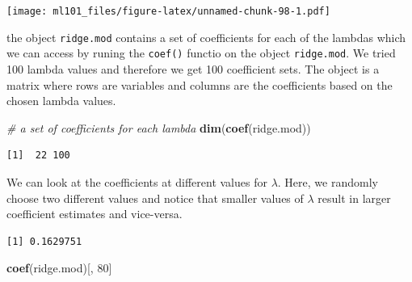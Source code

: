 \documentclass[]{article}
\newenvironment{Shaded}{\begin{snugshade}}{\end{snugshade}}
\newcommand{\CommentTok}[1]{\textcolor[rgb]{0.56,0.35,0.01}{\textit{#1}}}
\newcommand{\DecValTok}[1]{\textcolor[rgb]{0.00,0.00,0.81}{#1}}
\newcommand{\KeywordTok}[1]{\textcolor[rgb]{0.13,0.29,0.53}{\textbf{#1}}}
\newcommand{\NormalTok}[1]{#1}
\newcommand{\OperatorTok}[1]{\textcolor[rgb]{0.81,0.36,0.00}{\textbf{#1}}}
\begin{document}
\texttt{[image: ml101\_files/figure-latex/unnamed-chunk-98-1.pdf]}

the object \texttt{ridge.mod} contains a set of coefficients for each of the lambdas which we can access by runing the \texttt{coef()} functio on the object \texttt{ridge.mod}. We tried 100 lambda values and therefore we get 100 coefficient sets. The object is a matrix where rows are variables and columns are the coefficients based on the chosen lambda values.

\begin{Shaded}
\begin{Highlighting}[]
\CommentTok{# a set of coefficients for each lambda}
\KeywordTok{dim}\NormalTok{(}\KeywordTok{coef}\NormalTok{(ridge.mod))}
\end{Highlighting}
\end{Shaded}

\begin{verbatim}
[1]  22 100
\end{verbatim}

We can look at the coefficients at different values for \(\lambda\). Here, we randomly choose two different values and notice that smaller values of \(\lambda\) result in larger coefficient estimates and vice-versa.

\begin{Shaded}
\end{Shaded}

\begin{verbatim}
[1] 0.1629751
\end{verbatim}

\begin{Shaded}
\begin{Highlighting}[]
\KeywordTok{coef}\NormalTok{(ridge.mod)[, }\DecValTok{80}\NormalTok{]}
\end{Highlighting}
\end{Shaded}
\end{document}
